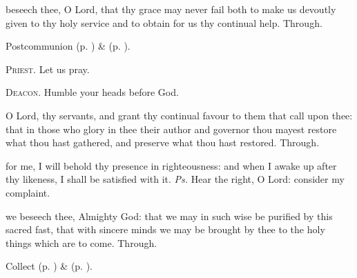 
\postcommunion
{} beseech thee, O Lord, that thy grace may never fail both to make us devoutly given to thy holy service and to obtain for us thy continual help. Through.

\begin{rubric}
     Postcommunion  (p. \pageref{AshWednesdayMassPostcommunion}) \&   (p. \pageref{SPLivingDeparted}).
\end{rubric}

\clearpage
\textsc{Priest.} Let us pray.\par
\textsc{Deacon.} Humble your heads before God.\par
{} O Lord, thy servants, and grant thy continual favour to them that call upon thee: that in those who glory in thee their author and governor thou mayest restore what thou hast gathered, and preserve what thou hast restored. Through.


\introit
{} for me, I will behold thy presence in righteousness: and when I awake up after thy likeness, I shall be satisfied with it. \textit{Ps.} Hear the right, O Lord: consider my complaint.

\collect
{} we beseech thee, Almighty God: that we may in such wise be purified by this sacred fast, that with sincere minds we may be brought by thee to the holy things which are to come. Through.
\begin{rubric}
     Collect  (p. \pageref{AshWednesdayMassCollect}) \&   (p. \pageref{SPLivingDeparted}).
\end{rubric}

